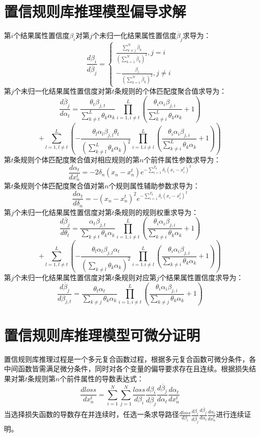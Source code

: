 \documentclass{cjc}
\begin{document}
\nocite{*}




\newpage



\appendix

\section{置信规则库推理模型偏导求解}
\label{Appendix A}
第$i$个结果属性置信度$\beta_i$对第$j$个未归一化结果属性置信度$\overline{\beta}_j$求导为：
$$\frac{d\beta_i}{d\overline{\beta}_j}=
\left\{
\begin{aligned}
\frac{\sum_{k\neq j}^N\overline{\beta}_k}{(\sum_{k=1}^N\overline{\beta}_k)^2},j=i\\
-\frac{\beta_i}{(\sum_{k=1}^N\overline{\beta}_k)^2},j\neq i
\end{aligned}
\right.$$
第$j$个未归一化结果属性置信度对第$t$条规则的个体匹配度聚合值求导为：
$$\frac{d\overline{\beta}_j}{d\alpha_t}=\frac{\theta_t\beta_{j,t}}{\sum_{k\neq t}^L\theta_k\alpha_k}\prod_{i=1,i\neq t}^L(\frac{\theta_i\alpha_i\beta_{j,i}}{\sum_{k\neq i}^L{\theta_k\alpha_k}}+1)$$
$$+\sum_{l=1,l\neq t}^L(-\frac{\theta_l\alpha_l\beta_{j,l}\theta_t}{(\sum_{k\neq l}^L\theta_k\alpha_k)^2}\prod_{i=1.i\neq l}^L(\frac{\theta_i\alpha_i\beta_{j,i}}{\sum_{k\neq i}^L{\theta_k\alpha_k}}+1))$$
第$t$条规则个体匹配度聚合值对相应规则的第$n$个前件属性参数求导为：
$$\frac{d\alpha_t}{dx_n^t}=-2\delta_n(x_n-x_n^t)e^{-\sum_{i=1}^{T_k}\delta_i(x_i-x_i^t)^2}$$
第$t$条规则个体匹配度聚合值对第$n$个规则属性辅助参数求导为：
$$\frac{d\alpha_t}{d\delta_n}=-(x_n-x_n^t)^{2}e^{-\sum_{i=1}^{T_k}\delta_i(x_i-x_i^t)^2}$$
第$j$个未归一化结果属性置信度对第$t$条规则的规则权重求导为：
$$\frac{d\overline{\beta}_j}{d\theta_t}=\frac{\alpha_t\beta_{j,t}}{\sum_{k\neq t}\theta_k\alpha_k}\prod_{i=1,i\neq t}^L(\frac{\theta_i\alpha_i\beta_{j,i}}{\sum_{k\neq i}{\theta_k\alpha_k}}+1)$$
$$+\sum_{l=1,l\neq t}^L(-\frac{\theta_l\alpha_l\beta_{j,l}\alpha_t}{(\sum_{k\neq l}\theta_k\alpha_k)^2}\prod_{i=1.i\neq l}^L(\frac{\theta_i\alpha_i\beta_{j,i}}{\sum_{k\neq i}{\theta_k\alpha_k}}+1))$$
第$j$个未归一化结果属性置信度对第$t$条规则对应第$j$个结果属性置信度求导为：
$$\frac{d\overline{\beta}_j}{d\beta_{j,t}}=\frac{\theta_t\alpha_t}{\sum_{k\neq j}\theta_k\alpha_k}\prod_{i=1,i\neq t}^L(\frac{\theta_i\alpha_i\beta_{j,i}}{\sum_{k\neq j}\theta_k\alpha_k}+1)$$

\section{置信规则库推理模型可微分证明}
\label{Appendix B}
置信规则库推理过程是一个多元复合函数过程，根据多元复合函数可微分条件，各中间函数皆需满足微分条件，同时对各个变量的偏导要求存在且连续。根据损失结果对第$t$条规则第$n$个前件属性的导数表达式：
$$\frac{dloss}{dx_n^t}=\sum_{i=1}^N\sum_{j=1}^N \frac{loss}{d\beta_i}\frac{d\beta_i}{d\overline{\beta}_j}\frac{d\overline{\beta}_j}{d\alpha_t}\frac{d\alpha_t}{dx_n^t}$$
当选择损失函数的导数存在并连续时，任选一条求导路径$\frac{dloss}{d\beta_i}\frac{d\beta_i}{d\overline{\beta}_j}\frac{d\overline{\beta}_j}{d\alpha_t}\frac{d\alpha_t}{dx_n^t}$进行连续证明。
\end{document}
